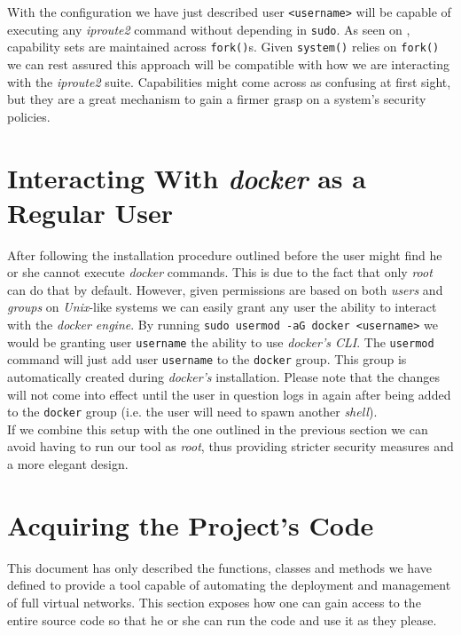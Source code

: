         With the configuration we have just described user \texttt{<username>} will be capable of executing any \textit{iproute2} command without depending in \texttt{sudo}. As seen on \cite{bib:man-capabilities}, capability sets are maintained across \texttt{fork()}s. Given \texttt{system()} relies on \texttt{fork()} we can rest assured this approach will be compatible with how we are interacting with the \textit{iproute2} suite. Capabilities might come across as confusing at first sight, but they are a great mechanism to gain a firmer grasp on a system's security policies.\\

    \section{Interacting With \textit{docker} as a Regular User}
        After following the installation procedure outlined before the user might find he or she cannot execute \textit{docker} commands. This is due to the fact that only \textit{root} can do that by default. However, given permissions are based on both \textit{users} and \textit{groups} on \textit{Unix}-like systems we can easily grant any user the ability to interact with the \textit{docker engine}. By running \texttt{sudo usermod -aG docker <username>} we would be granting user \texttt{username} the ability to use \textit{docker's CLI}. The \texttt{usermod} \cite{bib:man-usermod} command will just add user \texttt{username} to the \texttt{docker} group. This group is automatically created during \textit{docker's} installation. Please note that the changes will not come into effect until the user in question logs in again after being added to the \texttt{docker} group (i.e. the user will need to spawn another \textit{shell}).\\

        If we combine this setup with the one outlined in the previous section we can avoid having to run our tool as \textit{root}, thus providing stricter security measures and a more elegant design.\\

    \section{Acquiring the Project's Code}
        This document has only described the functions, classes and methods we have defined to provide a tool capable of automating the deployment and management of full virtual networks. This section exposes how one can gain access to the entire source code so that he or she can run the code and use it as they please.\\


